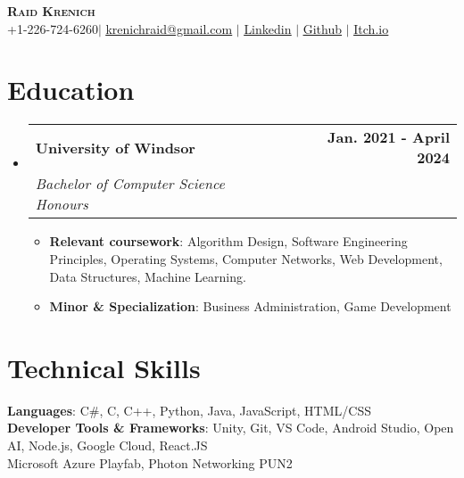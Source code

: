 \documentclass[letterpaper,11pt]{article}
\makeatletter
\newcommand{\resumeItem}[1]{
  \item\small{
    {#1 \vspace{-2pt}}
  }
}
\newcommand{\resumeSubheading}[4]{
  \vspace{-2pt}\item
    \begin{tabular*}{0.97\textwidth}[t]{l@{\extracolsep{\fill}}r}
      \textbf{#1} & #2 \\
      \textit{\small#3} & \textit{\small #4} \\
    \end{tabular*}\vspace{-7pt}
}
\newcommand{\resumeSubHeadingListStart}{\begin{itemize}[leftmargin=0.15in, label={}]}
\newcommand{\resumeSubHeadingListEnd}{\end{itemize}}
\newcommand{\resumeItemListStart}{\begin{itemize}}
\newcommand{\resumeItemListEnd}{\end{itemize}\vspace{-5pt}}
\makeatother
\begin{document}
\begin{center}
    \textbf{\Huge \scshape Raid Krenich} \\ \vspace{1pt}
    \small +1-226-724-6260$|$ \href{mailto:krenichraid@gmail.com}{\underline{krenichraid@gmail.com}} $|$ 
    \href{https://www.linkedin.com/in/raid-krenich-239208253/}{\underline{Linkedin}} $|$
    \href{https://github.com/Krenich09}{\underline{Github}} $|$
    \href{https://rq1d.itch.io/}{\underline{Itch.io}}
\end{center}

%


\section{Education}
  \resumeSubHeadingListStart
    \resumeSubheading
      {University of Windsor}{\textbf{Jan. 2021 - April 2024}}
      {Bachelor of Computer Science Honours}{}
        \resumeItemListStart{}
          \resumeItem{\textbf{Relevant coursework}: Algorithm Design, Software Engineering Principles, Operating Systems, Computer Networks, Web Development, Data Structures, Machine Learning.}
          \resumeItem{\textbf{Minor \& Specialization}: Business Administration, Game Development}
        \resumeItemListEnd
  \resumeSubHeadingListEnd

%
\section{Technical Skills}
 \begin{itemize}[leftmargin=0.15in, label={}]
    \small{\item{
     \textbf{Languages}{: C\#, C, C++, Python, Java, JavaScript, HTML/CSS} \\
     \textbf{Developer Tools \& Frameworks}{: Unity, Git, VS Code, Android Studio, Open AI, Node.js, Google Cloud, React.JS } \\
     \textbf{}{ Microsoft Azure Playfab, Photon Networking PUN2}
    }}
 \end{itemize}
\end{document}

